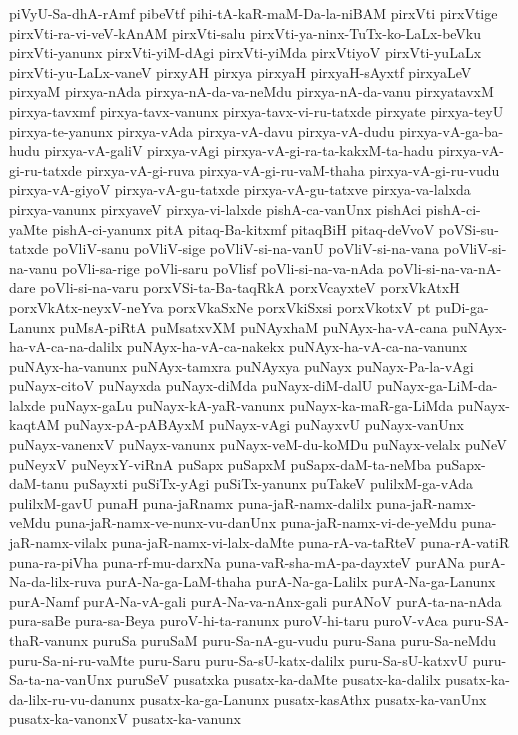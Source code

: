 {piVyU-Sa-dhA-rAmf
pibeVtf
pihi-tA-kaR-maM-Da-la-niBAM
pirxVti
pirxVtige
pirxVti-ra-vi-veV-kAnAM
pirxVti-salu
pirxVti-ya-ninx-TuTx-ko-LaLx-beVku
pirxVti-yanunx
pirxVti-yiM-dAgi
pirxVti-yiMda
pirxVtiyoV
pirxVti-yuLaLx
pirxVti-yu-LaLx-vaneV
pirxyAH
pirxya
pirxyaH
pirxyaH-sAyxtf
pirxyaLeV
pirxyaM
pirxya-nAda
pirxya-nA-da-va-neMdu
pirxya-nA-da-vanu
pirxyatavxM
pirxya-tavxmf
pirxya-tavx-vanunx
pirxya-tavx-vi-ru-tatxde
pirxyate
pirxya-teyU
pirxya-te-yanunx
pirxya-vAda
pirxya-vA-davu
pirxya-vA-dudu
pirxya-vA-ga-ba-hudu
pirxya-vA-galiV
pirxya-vAgi
pirxya-vA-gi-ra-ta-kakxM-ta-hadu
pirxya-vA-gi-ru-tatxde
pirxya-vA-gi-ruva
pirxya-vA-gi-ru-vaM-thaha
pirxya-vA-gi-ru-vudu
pirxya-vA-giyoV
pirxya-vA-gu-tatxde
pirxya-vA-gu-tatxve
pirxya-va-lalxda
pirxya-vanunx
pirxyaveV
pirxya-vi-lalxde
pishA-ca-vanUnx
pishAci
pishA-ci-yaMte
pishA-ci-yanunx
pitA
pitaq-Ba-kitxmf
pitaqBiH
pitaq-deVvoV
poVSi-su-tatxde
poVliV-sanu
poVliV-sige
poVliV-si-na-vanU
poVliV-si-na-vana
poVliV-si-na-vanu
poVli-sa-rige
poVli-saru
poVlisf
poVli-si-na-va-nAda
poVli-si-na-va-nA-dare
poVli-si-na-varu
porxVSi-ta-Ba-taqRkA
porxVcayxteV
porxVkAtxH
porxVkAtx-neyxV-neYva
porxVkaSxNe
porxVkiSxsi
porxVkotxV
pt
puDi-ga-Lanunx
puMsA-piRtA
puMsatxvXM
puNAyxhaM
puNAyx-ha-vA-cana
puNAyx-ha-vA-ca-na-dalilx
puNAyx-ha-vA-ca-nakekx
puNAyx-ha-vA-ca-na-vanunx
puNAyx-ha-vanunx
puNAyx-tamxra
puNAyxya
puNayx
puNayx-Pa-la-vAgi
puNayx-citoV
puNayxda
puNayx-diMda
puNayx-diM-dalU
puNayx-ga-LiM-da-lalxde
puNayx-gaLu
puNayx-kA-yaR-vanunx
puNayx-ka-maR-ga-LiMda
puNayx-kaqtAM
puNayx-pA-pABAyxM
puNayx-vAgi
puNayxvU
puNayx-vanUnx
puNayx-vanenxV
puNayx-vanunx
puNayx-veM-du-koMDu
puNayx-velalx
puNeV
puNeyxV
puNeyxY-viRnA
puSapx
puSapxM
puSapx-daM-ta-neMba
puSapx-daM-tanu
puSayxti
puSiTx-yAgi
puSiTx-yanunx
puTakeV
pulilxM-ga-vAda
pulilxM-gavU
punaH
puna-jaRnamx
puna-jaR-namx-dalilx
puna-jaR-namx-veMdu
puna-jaR-namx-ve-nunx-vu-danUnx
puna-jaR-namx-vi-de-yeMdu
puna-jaR-namx-vilalx
puna-jaR-namx-vi-lalx-daMte
puna-rA-va-taRteV
puna-rA-vatiR
puna-ra-piVha
puna-rf-mu-darxNa
puna-vaR-sha-mA-pa-dayxteV
purANa
purA-Na-da-lilx-ruva
purA-Na-ga-LaM-thaha
purA-Na-ga-Lalilx
purA-Na-ga-Lanunx
purA-Namf
purA-Na-vA-gali
purA-Na-va-nAnx-gali
purANoV
purA-ta-na-nAda
pura-saBe
pura-sa-Beya
puroV-hi-ta-ranunx
puroV-hi-taru
puroV-vAca
puru-SA-thaR-vanunx
puruSa
puruSaM
puru-Sa-nA-gu-vudu
puru-Sana
puru-Sa-neMdu
puru-Sa-ni-ru-vaMte
puru-Saru
puru-Sa-sU-katx-dalilx
puru-Sa-sU-katxvU
puru-Sa-ta-na-vanUnx
puruSeV
pusatxka
pusatx-ka-daMte
pusatx-ka-dalilx
pusatx-ka-da-lilx-ru-vu-danunx
pusatx-ka-ga-Lanunx
pusatx-kasAthx
pusatx-ka-vanUnx
pusatx-ka-vanonxV
pusatx-ka-vanunx
}
